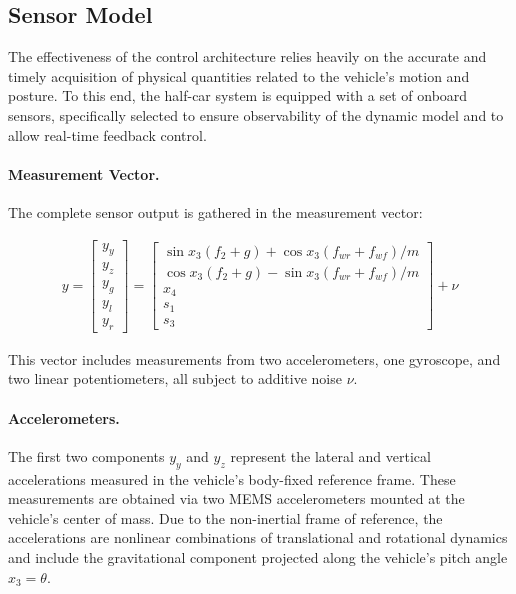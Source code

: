 \documentclass[]{report}
\begin{document}
\subsection{Sensor Model}

The effectiveness of the control architecture relies heavily on the accurate and timely acquisition of physical quantities related to the vehicle's motion and posture. To this end, the half-car system is equipped with a set of onboard sensors, specifically selected to ensure observability of the dynamic model and to allow real-time feedback control.

\paragraph{Measurement Vector.}
The complete sensor output is gathered in the measurement vector:

\begin{align}
	y = \begin{bmatrix}
		y_y \\ y_z \\ y_g \\ y_l \\ y_r
	\end{bmatrix} =
	\begin{bmatrix}
		\sin x_3(f_2 + g) + \cos x_3(f_{wr} + f_{wf})/m \\
		\cos x_3(f_2 + g) - \sin x_3(f_{wr} + f_{wf})/m \\
		x_4 \\
		s_1 \\
		s_3
	\end{bmatrix} + \nu
\end{align}

This vector includes measurements from two accelerometers, one gyroscope, and two linear potentiometers, all subject to additive noise $\nu$.

\paragraph{Accelerometers.}
The first two components $y_y$ and $y_z$ represent the lateral and vertical accelerations measured in the vehicle’s body-fixed reference frame. These measurements are obtained via two MEMS accelerometers mounted at the vehicle's center of mass. Due to the non-inertial frame of reference, the accelerations are nonlinear combinations of translational and rotational dynamics and include the gravitational component projected along the vehicle's pitch angle $x_3 = \theta$.
\end{document}
